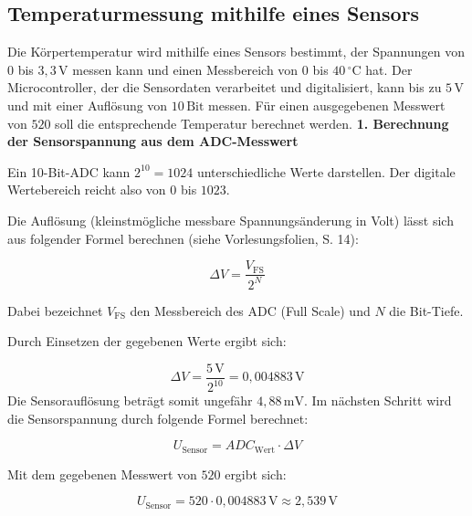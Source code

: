 \documentclass[a4paper,oneside,10pt]{article}%
\begin{document}
\subsection{Temperaturmessung mithilfe eines Sensors}
Die Körpertemperatur wird mithilfe eines Sensors bestimmt, der Spannungen von
$0$ bis $3{,}3\,\mathrm{V}$ messen kann und einen Messbereich von 
$0$ bis $40\,^\circ\mathrm{C}$ hat. Der Microcontroller, der die Sensordaten
verarbeitet und digitalisiert, kann bis zu $5\,\mathrm{V}$ und mit einer Auflösung 
von $10\,\mathrm{Bit}$ messen.
Für einen ausgegebenen Messwert von $520$ soll die entsprechende Temperatur berechnet werden.
\newline
\newline
\textbf{1. Berechnung der Sensorspannung aus dem ADC-Messwert}

Ein 10-Bit-ADC kann $2^{10}=1024$ unterschiedliche Werte darstellen.
Der digitale Wertebereich reicht also von $0$ bis $1023$.

Die Auflösung (kleinstmögliche messbare Spannungsänderung in Volt) lässt sich
aus folgender Formel berechnen (siehe Vorlesungsfolien, S. 14)\cite{vorlesung_signalerfassung}:

\begin{equation}
    \Delta V = \frac{V_{\mathrm{FS}}}{2^N}
\end{equation}

Dabei bezeichnet $V_{\mathrm{FS}}$ den Messbereich des ADC (Full Scale)
und $N$ die Bit-Tiefe.

Durch Einsetzen der gegebenen Werte ergibt sich:

\begin{equation}
    \Delta V = \frac{5\,\mathrm{V}}{2^{10}}
    = 0{,}004883\,\mathrm{V}
\end{equation}
\newline
Die Sensorauflösung beträgt somit ungefähr $4{,}88\,\mathrm{mV}$.
\newline
Im nächsten Schritt wird die Sensorspannung durch folgende Formel berechnet:

\begin{equation}
    U_{\mathrm{Sensor}} =
    ADC_{\mathrm{Wert}} \cdot \Delta V
\end{equation}

Mit dem gegebenen Messwert von $520$ ergibt sich:

\begin{equation}
    U_{\mathrm{Sensor}} =
    520 \cdot 0{,}004883\,\mathrm{V}{\approx 2{,}539\,\mathrm{V}}
\end{equation}
\end{document}
